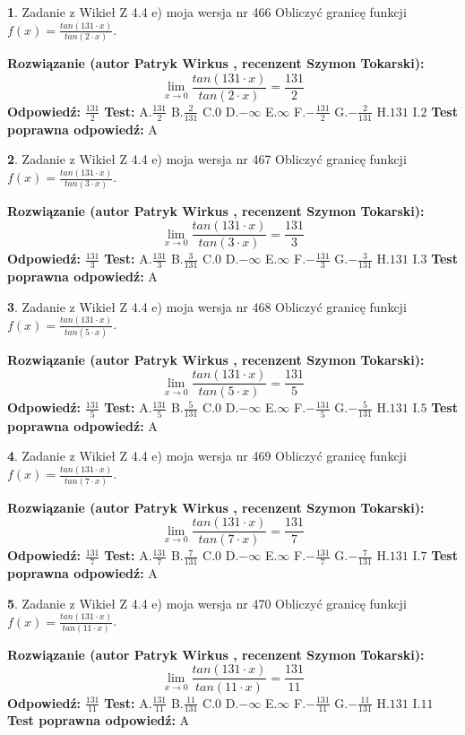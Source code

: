 \documentclass[12pt, a4paper]{article}
\theoremstyle{definition} %
\newtheorem{zad}{}
\newcommand{\zadStart}[1]{\begin{zad}#1\newline}
\newcommand{\zadStop}{\end{zad}}
\newcommand{\rozwStart}[2]{\noindent \textbf{Rozwiązanie (autor #1 , recenzent #2): }\newline}
\newcommand{\rozwStop}{\newline}
\newcommand{\odpStart}{\noindent \textbf{Odpowiedź:}\newline}
\newcommand{\odpStop}{\newline}
\newcommand{\testStart}{\noindent \textbf{Test:}\newline}
\newcommand{\testStop}{\newline}
\newcommand{\kluczStart}{\noindent \textbf{Test poprawna odpowiedź:}\newline}
\newcommand{\kluczStop}{\newline}
\begin{document}
\zadStart{Zadanie z Wikieł Z 4.4 e) moja wersja nr 466}
Obliczyć granicę funkcji $f(x)=\frac{tan(131\cdot x)}{tan(2\cdot x)}$.
\zadStop
\rozwStart{Patryk Wirkus}{Szymon Tokarski}
$$\lim\limits_{x\to 0}\frac{tan(131\cdot x)}{tan(2\cdot x)}=
\frac{131}{2}$$
\rozwStop
\odpStart
$\frac{131}{2}$
\odpStop
\testStart
A.$\frac{131}{2}$
B.$\frac{2}{131}$
C.$0$
D.$-\infty$
E.$\infty$
F.$-\frac{131}{2}$
G.$-\frac{2}{131}$
H.$131$
I.$2$
\testStop
\kluczStart
A
\kluczStop



\zadStart{Zadanie z Wikieł Z 4.4 e) moja wersja nr 467}
Obliczyć granicę funkcji $f(x)=\frac{tan(131\cdot x)}{tan(3\cdot x)}$.
\zadStop
\rozwStart{Patryk Wirkus}{Szymon Tokarski}
$$\lim\limits_{x\to 0}\frac{tan(131\cdot x)}{tan(3\cdot x)}=
\frac{131}{3}$$
\rozwStop
\odpStart
$\frac{131}{3}$
\odpStop
\testStart
A.$\frac{131}{3}$
B.$\frac{3}{131}$
C.$0$
D.$-\infty$
E.$\infty$
F.$-\frac{131}{3}$
G.$-\frac{3}{131}$
H.$131$
I.$3$
\testStop
\kluczStart
A
\kluczStop



\zadStart{Zadanie z Wikieł Z 4.4 e) moja wersja nr 468}
Obliczyć granicę funkcji $f(x)=\frac{tan(131\cdot x)}{tan(5\cdot x)}$.
\zadStop
\rozwStart{Patryk Wirkus}{Szymon Tokarski}
$$\lim\limits_{x\to 0}\frac{tan(131\cdot x)}{tan(5\cdot x)}=
\frac{131}{5}$$
\rozwStop
\odpStart
$\frac{131}{5}$
\odpStop
\testStart
A.$\frac{131}{5}$
B.$\frac{5}{131}$
C.$0$
D.$-\infty$
E.$\infty$
F.$-\frac{131}{5}$
G.$-\frac{5}{131}$
H.$131$
I.$5$
\testStop
\kluczStart
A
\kluczStop



\zadStart{Zadanie z Wikieł Z 4.4 e) moja wersja nr 469}
Obliczyć granicę funkcji $f(x)=\frac{tan(131\cdot x)}{tan(7\cdot x)}$.
\zadStop
\rozwStart{Patryk Wirkus}{Szymon Tokarski}
$$\lim\limits_{x\to 0}\frac{tan(131\cdot x)}{tan(7\cdot x)}=
\frac{131}{7}$$
\rozwStop
\odpStart
$\frac{131}{7}$
\odpStop
\testStart
A.$\frac{131}{7}$
B.$\frac{7}{131}$
C.$0$
D.$-\infty$
E.$\infty$
F.$-\frac{131}{7}$
G.$-\frac{7}{131}$
H.$131$
I.$7$
\testStop
\kluczStart
A
\kluczStop



\zadStart{Zadanie z Wikieł Z 4.4 e) moja wersja nr 470}
Obliczyć granicę funkcji $f(x)=\frac{tan(131\cdot x)}{tan(11\cdot x)}$.
\zadStop
\rozwStart{Patryk Wirkus}{Szymon Tokarski}
$$\lim\limits_{x\to 0}\frac{tan(131\cdot x)}{tan(11\cdot x)}=
\frac{131}{11}$$
\rozwStop
\odpStart
$\frac{131}{11}$
\odpStop
\testStart
A.$\frac{131}{11}$
B.$\frac{11}{131}$
C.$0$
D.$-\infty$
E.$\infty$
F.$-\frac{131}{11}$
G.$-\frac{11}{131}$
H.$131$
I.$11$
\testStop
\kluczStart
A
\kluczStop
\end{document}
